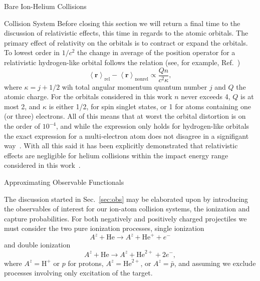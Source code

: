 \documentclass[a5paper, 9 pt]{extreport}
\begin{document}
\begin{chapter}{Bare Ion-Helium Collisions \label{chap:p-he2p-he}}
\begin{section}{Collision System \label{sec:p-he2p-he-sys}}
      Before closing this section we will return a final time to the discussion of relativistic effects,
      this time in regards to the atomic orbitals. The primary effect of relativity on the orbitals is
      to contract or expand the orbitals. To lowest order in $1/c^2$ the change in average of the
      position operator for a relativistic hydrogen-like orbital follows the relation (see, for example,
      Ref.~\cite{relorb})
      \begin{equation} \label{eq:radDiff}
         \left< \mathbf{r} \right>_\mathrm{rel}
       - \left< \mathbf{r} \right>_\mathrm{nonrel} \propto \frac{Q n}{c^2 \kappa},
      \end{equation}
      where $\kappa = j + 1/2$ wih total angular momentum quantum number $j$ and $Q$ the atomic charge.
      For the orbitals considered in this work $n$ never exceeds 4, $Q$ is at most 2, and $\kappa$ is
      either 1/2, for spin singlet states, or 1 for atoms containing one (or three) electrons. All of
      this means that at worst the orbital distortion is on the order of $10^{-4}$, and while the
      expression only holds for hydrogen-like orbitals the exact expression for a multi-electron atom
      does not disagree in a signifigant way~\cite{relorb}. With all this said it has been explicitly
      demonstrated that relativistic effects are negligible for helium collisions within the impact
      energy range considered in this work~\cite{relCollision}.

   \end{section}

   \begin{section}{Approximating Observable Functionals \label{sec:phe2p-obs}}

      The discussion started in Sec.~\ref{sec:obs} may be elaborated upon by introducing the observables
      of interest for our ion-atom collision systems, the ionization and capture probabilities. For both
      negatively and positively charged projectiles we must consider the two pure ionization processes,
      single ionization
      \begin{equation} \label{eq:TI}
         A^z + \mathrm{He} \rightarrow A^z + \mathrm{He}^+ + e^-
      \end{equation}
      and double ionization
      \begin{equation} \label{eq:II}
         A^z + \mathrm{He} \rightarrow A^z + \mathrm{He}^{2+} + 2e^-,
      \end{equation}
      where $A^z = \mathrm{H}^+$ or $p$ for protons, $A^z = \mathrm{He}^{2+}$, or $A^z = \bar{p}$, and
      assuming we exclude processes involving only excitation of the target.


\end{section}
\end{chapter}
\end{document}
